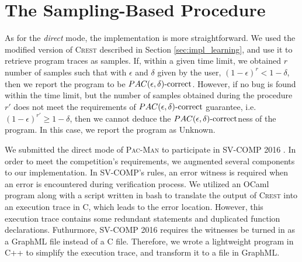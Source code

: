 \section{The Sampling-Based Procedure}\label{sec:impl_sampling}

As for the \emph{direct} mode, the implementation is more straightforward. We used the modified version of \textsc{Crest} described in Section \ref{sec:impl_learning}, and use it to retrieve program traces as samples. If, within a given time limit, we obtained $r$ number of samples such that with $\epsilon$ and $\delta$ given by the user, $(1-\epsilon)^r < 1-\delta$, then we report the program to be $PAC(\epsilon, \delta)\text{-correct}$. However, if no bug is found within the time limit, but the number of samples obtained during the procedure $r'$ does not meet the requirements of $PAC(\epsilon, \delta)\text{-correct}$ guarantee, i.e. $(1-\epsilon)^{r'} \geq 1 - \delta$, then we cannot deduce the $PAC(\epsilon, \delta)\text{-correct}$ness of the program. In this case, we report the program as Unknown.

We submitted the direct mode of \textsc{Pac-Man} to participate in SV-COMP 2016 \cite{svcomp16}. In order to meet the competition's requirements, we augmented several components to our implementation. In SV-COMP's rules, an error witness is required when an error is encountered during verification process. We utilized an OCaml program along with a script written in bash to translate the output of \textsc{Crest} into an execution trace in C, which leads to the error location. However, this execution trace contains some redundant statements and duplicated function declarations. Futhurmore, SV-COMP 2016 requires the witnesses be turned in as a GraphML \cite{graphml} file instead of a C file. Therefore, we wrote a lightweight program in C++ to simplify the execution trace, and transform it to a file in GraphML. 